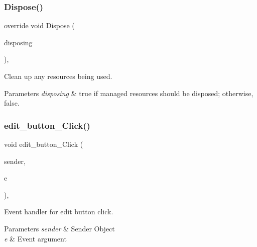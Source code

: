 \subsubsection{\texorpdfstring{Dispose()}{Dispose()}}
{\footnotesize\ttfamily override void Dispose (\begin{DoxyParamCaption}\item[{bool}]{disposing }\end{DoxyParamCaption})\hspace{0.3cm}{\ttfamily [inline]}, {\ttfamily [protected]}}



Clean up any resources being used. 


\begin{DoxyParams}{Parameters}
{\em disposing} & true if managed resources should be disposed; otherwise, false.\\
\hline
\end{DoxyParams}
\mbox{\label{classWildlifeTrackingApp_1_1Category_adef76d49a202d1276ec8ca56b5b0bd3b}} 
\subsubsection{\texorpdfstring{edit\+\_\+button\+\_\+\+Click()}{edit\_button\_Click()}}
{\footnotesize\ttfamily void edit\+\_\+button\+\_\+\+Click (\begin{DoxyParamCaption}\item[{object}]{sender,  }\item[{Event\+Args}]{e }\end{DoxyParamCaption})\hspace{0.3cm}{\ttfamily [inline]}, {\ttfamily [private]}}



Event handler for edit button click. 


\begin{DoxyParams}{Parameters}
{\em sender} & Sender Object\\
\hline
{\em e} & Event argument\\
\hline
\end{DoxyParams}
\mbox{\label{classWildlifeTrackingApp_1_1Category_ad0b8994ac9ba019fb7cd6564e0ce4234}} 
